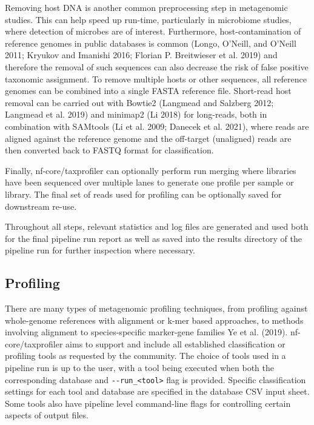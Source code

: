 \documentclass[
]{article}
\begin{document}
Removing host DNA is another common preprocessing step in metagenomic
studies. This can help speed up run-time, particularly in microbiome
studies, where detection of microbes are of interest. Furthermore,
host-contamination of reference genomes in public databases is common
(Longo, O'Neill, and O'Neill 2011; Kryukov and Imanishi 2016; Florian P.
Breitwieser et al. 2019) and therefore the removal of such sequences can
also decrease the risk of false positive taxonomic assignment. To remove
multiple hosts or other sequences, all reference genomes can be combined
into a single FASTA reference file. Short-read host removal can be
carried out with Bowtie2 (Langmead and Salzberg 2012; Langmead et al.
2019) and minimap2 (Li 2018) for long-reads, both in combination with
SAMtools (Li et al. 2009; Danecek et al. 2021), where reads are aligned
against the reference genome and the off-target (unaligned) reads are
then converted back to FASTQ format for classification.

Finally, nf-core/taxprofiler can optionally perform run merging where
libraries have been sequenced over multiple lanes to generate one
profile per sample or library. The final set of reads used for profiling
can be optionally saved for downstream re-use.

Throughout all steps, relevant statistics and log files are generated
and used both for the final pipeline run report as well as saved into
the results directory of the pipeline run for further inspection where
necessary.

\hypertarget{profiling}{%
\subsection{Profiling}\label{profiling}}

There are many types of metagenomic profiling techniques, from profiling
against whole-genome references with alignment or k-mer based
approaches, to methods involving alignment to species-specific
marker-gene families Ye et al. (2019). nf-core/taxprofiler aims to
support and include all established classification or profiling tools as
requested by the community. The choice of tools used in a pipeline run
is up to the user, with a tool being executed when both the
corresponding database and
\texttt{-\/-run\_\textless{}tool\textgreater{}} flag is provided.
Specific classification settings for each tool and database are
specified in the database CSV input sheet. Some tools also have pipeline
level command-line flags for controlling certain aspects of output
files.
\end{document}
